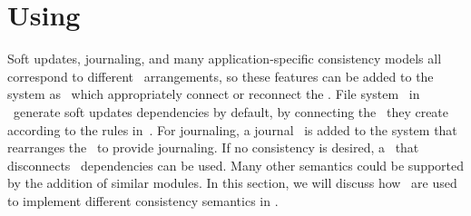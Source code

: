 \section{Using \ChDescs}
\label{sec:using}

Soft updates, journaling, and many application-specific consistency models all
correspond to different \chdesc\ arrangements, so these features can be added to
the system as \modules\ which appropriately connect or reconnect the \chdescs.
%
File system \modules\ in \Kudos\ generate soft updates dependencies by default,
by connecting the \chdescs\ they create according to the rules
in~\cite{ganger00soft}.
%
For journaling, a journal \module\ is added to the system that rearranges the
\chdescs\ to provide journaling.
%
If no consistency is desired, a \module\ that disconnects \chdesc\ dependencies
can be used.
%
Many other semantics could be supported by the addition of similar modules. In
this section, we will discuss how \chdescs\ are used to implement different
consistency semantics in \Kudos.






